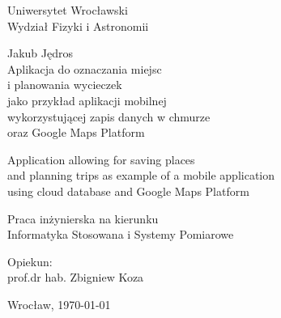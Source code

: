 \documentclass[a4paper,12pt]{article}
\begin{document}
    \begin{center}

    \thispagestyle{empty}

    \Large 
    Uniwersytet Wrocławski\\
    Wydział Fizyki i Astronomii\\
    \vspace{0.8cm}
    \vspace{1.3cm}

    \Large Jakub Jędros \\
    \vspace{3cm}
    {
    	\Large 
        Aplikacja do oznaczania miejsc\\  i 
        planowania wycieczek \\
        jako przykład aplikacji mobilnej \\ wykorzystującej 
        zapis danych w chmurze \\ oraz Google Maps Platform
    }   
 
    \vspace{1.5cm}
    {
        \large
        Application allowing for saving places \\
        and planning trips as example of a mobile application \\
        using cloud database and Google Maps Platform
    }
    \end{center}
    \vspace{3.7cm}
    \begin{flushright}
    \large{ Praca inżynierska na kierunku \\Informatyka Stosowana i Systemy Pomiarowe}
    \vspace{0.5cm}
    
    \large{ Opiekun: \\ prof.\@ dr hab. Zbigniew Koza}
    \end{flushright}
    \vspace{1.3cm}

    \begin{center}
    \large Wrocław, \today
    \end{center}


\newpage

    \tableofcontents


















\newpage
    \printbibliography[]
\end{document}
